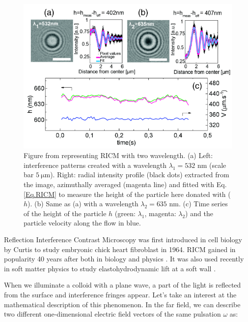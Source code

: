 \begin{figure}[h]
	\centering
	\includegraphics[scale=0.8]{02_body/chapter2/images/RICM.png}
	\caption{Figure from \cite{davies_elastohydrodynamic_2018} representing \gls{RICM} with two wavelength. (a) Left: interference patterns created with a wavelength $\lambda_1 = 532$ nm (scale bar $ 5~\mathrm{\mu m}$). 
		Right: radial intensity profile (black dots) extracted from the image, azimuthally averaged (magenta line) and fitted with Eq.\ref{Eq.RICM} to measure the height of the particle here donated with ($h$). (b) Same as (a) with a wavelength $\lambda_2 = 635$ nm. (c) Time series of the height of the particle $h$ (green: $ \lambda_1$, magenta: $\lambda_2$) and the particle velocity along the flow in blue. }
	\label{fig.RICM}
\end{figure}


Reflection Interference Contrast Microscopy was first introduced in cell biology by Curtis to study embryonic chick heart fibroblast \cite{curtis_mechanism_1964} in 1964. \gls{RICM} gained in popularity 40 years after both in biology and physics \cite{filler_reflection_2000, siver_use_2000, weber_2_2003, limozin_quantitative_2009, nadal_probing_2002, raedler_measurement_1992}. It was also used recently in soft matter physics to study elastohydrodynamic lift at a soft wall \cite{davies_elastohydrodynamic_2018}.

When we illuminate a colloid with a plane wave, a part of the light is reflected from the surface and interference fringes appear. Let's take an interest at the mathematical description of this phenomenon. In the far field, we can describe two different one-dimensional electric field vectors of the same pulsation $\omega$ \cite{f_bohren_absorption_1998} as:

